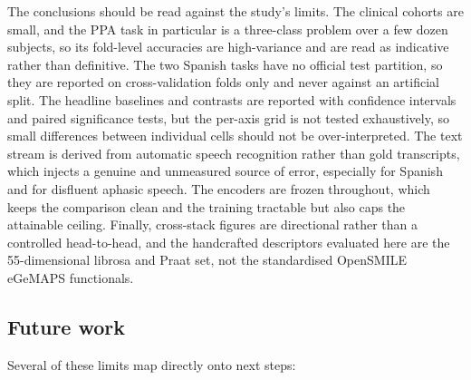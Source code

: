 \documentclass[a4paper,12pt]{article}
\begin{document}
The conclusions should be read against the study's limits. The clinical cohorts are small, and the PPA task in particular is a three-class problem over a few dozen subjects, so its fold-level accuracies are high-variance and are read as indicative rather than definitive. The two Spanish tasks have no official test partition, so they are reported on cross-validation folds only and never against an artificial split. The headline baselines and contrasts are reported with confidence intervals and paired significance tests, but the per-axis grid is not tested exhaustively, so small differences between individual cells should not be over-interpreted. The text stream is derived from automatic speech recognition rather than gold transcripts, which injects a genuine and unmeasured source of error, especially for Spanish and for disfluent aphasic speech. The encoders are frozen throughout, which keeps the comparison clean and the training tractable but also caps the attainable ceiling. Finally, cross-stack figures are directional rather than a controlled head-to-head, and the handcrafted descriptors evaluated here are the 55-dimensional librosa and Praat set, not the standardised OpenSMILE eGeMAPS functionals.

\subsection{Future work}

Several of these limits map directly onto next steps:
\end{document}
